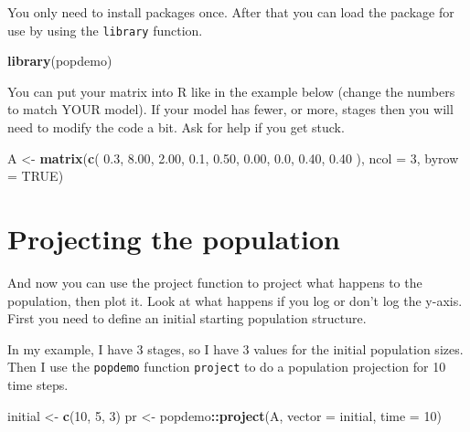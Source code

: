 \documentclass[
  a4paper]{book}
\newenvironment{Shaded}{\begin{snugshade}}{\end{snugshade}}
\newcommand{\AttributeTok}[1]{\textcolor[rgb]{0.13,0.29,0.53}{#1}}
\newcommand{\ConstantTok}[1]{\textcolor[rgb]{0.56,0.35,0.01}{#1}}
\newcommand{\DecValTok}[1]{\textcolor[rgb]{0.00,0.00,0.81}{#1}}
\newcommand{\FloatTok}[1]{\textcolor[rgb]{0.00,0.00,0.81}{#1}}
\newcommand{\FunctionTok}[1]{\textcolor[rgb]{0.13,0.29,0.53}{\textbf{#1}}}
\newcommand{\NormalTok}[1]{#1}
\newcommand{\OtherTok}[1]{\textcolor[rgb]{0.56,0.35,0.01}{#1}}
\newcommand{\SpecialCharTok}[1]{\textcolor[rgb]{0.81,0.36,0.00}{\textbf{#1}}}
\begin{document}
You only need to install packages once. After that you can load the package for use by using the \texttt{library} function.

\begin{Shaded}
\begin{Highlighting}[]
\FunctionTok{library}\NormalTok{(popdemo)}
\end{Highlighting}
\end{Shaded}

You can put your matrix into R like in the example below (change the numbers to match YOUR model). If your model has fewer, or more, stages then you will need to modify the code a bit. Ask for help if you get stuck.

\begin{Shaded}
\begin{Highlighting}[]
\NormalTok{A }\OtherTok{\textless{}{-}} \FunctionTok{matrix}\NormalTok{(}\FunctionTok{c}\NormalTok{(}
  \FloatTok{0.3}\NormalTok{, }\FloatTok{8.00}\NormalTok{, }\FloatTok{2.00}\NormalTok{,}
  \FloatTok{0.1}\NormalTok{, }\FloatTok{0.50}\NormalTok{, }\FloatTok{0.00}\NormalTok{,}
  \FloatTok{0.0}\NormalTok{, }\FloatTok{0.40}\NormalTok{, }\FloatTok{0.40}
\NormalTok{), }\AttributeTok{ncol =} \DecValTok{3}\NormalTok{, }\AttributeTok{byrow =} \ConstantTok{TRUE}\NormalTok{)}
\end{Highlighting}
\end{Shaded}

\section{Projecting the population}\label{projecting-the-population}

And now you can use the project function to project what happens to the population, then plot it. Look at what happens if you log or don't log the y-axis. First you need to define an initial starting population structure.

In my example, I have 3 stages, so I have 3 values for the initial population sizes. Then I use the \texttt{popdemo} function \texttt{project} to do a population projection for 10 time steps.

\begin{Shaded}
\begin{Highlighting}[]
\NormalTok{initial }\OtherTok{\textless{}{-}} \FunctionTok{c}\NormalTok{(}\DecValTok{10}\NormalTok{, }\DecValTok{5}\NormalTok{, }\DecValTok{3}\NormalTok{)}
\NormalTok{pr }\OtherTok{\textless{}{-}}\NormalTok{ popdemo}\SpecialCharTok{::}\FunctionTok{project}\NormalTok{(A, }\AttributeTok{vector =}\NormalTok{ initial, }\AttributeTok{time =} \DecValTok{10}\NormalTok{)}
\end{Highlighting}
\end{Shaded}
\end{document}
